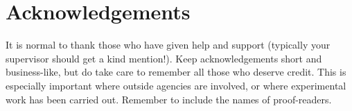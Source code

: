 
\newpage
{}

\section*{Acknowledgements}

It is normal to thank those who have given help and support (typically your supervisor should
get a kind mention!). Keep acknowledgements short and business-like, but do take care to
remember all those who deserve credit. This is especially important where outside agencies
are involved, or where experimental work has been carried out. Remember to include the
names of proof-readers.